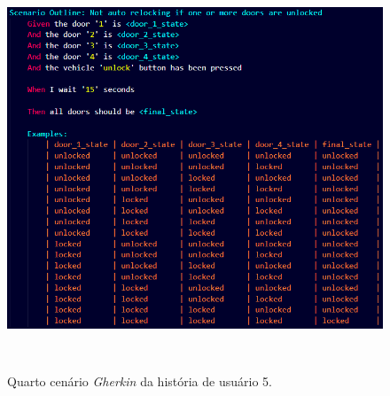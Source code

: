         
        
        
    

\begin{figure}[H]
\centering
\includegraphics[height=12cm]{figuras/cenarios/h5c4.png}
\caption{Quarto cenário \textit{Gherkin} da história de usuário 5.}
\label{fig:h5c4}
\end{figure}

